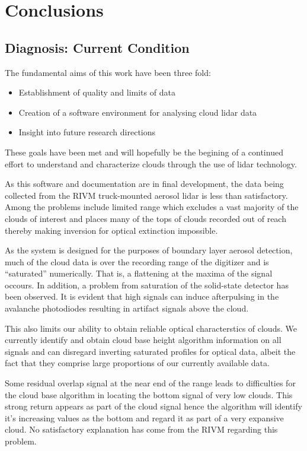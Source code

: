 \chapter{Conclusions}

\section{Diagnosis: Current Condition}

The fundamental aims of this work have been 
three fold:

\begin{itemize}
\item Establishment of quality and limits of data
\item Creation of a software environment for analysing
cloud lidar data
\item Insight into future research directions
\end{itemize}

\noindent
These goals have been met and will hopefully be the begining
of a continued effort to understand and characterize clouds
through the use of lidar technology.

As this software and documentation are in final
development, the data being collected from the RIVM truck-mounted aerosol
lidar is less than satisfactory. Among the problems include limited
range which excludes a vast majority of the clouds of interest and
places many of the tops of clouds recorded out of reach thereby making
inversion for optical extinction impossible. 

As the system is designed
for the purposes of boundary layer aerosol detection,  much of the cloud
data is over the recording range of the digitizer and is
``saturated'' numerically. That is, a flattening at the maxima of the
signal occours. In addition, a problem from saturation of the solid-state
detector has been observed. It is evident that high signals can induce
afterpulsing in the avalanche photodiodes resulting in artifact signals
above the cloud.

This also limits our ability to obtain reliable
optical characterstics of clouds. We currently identify and 
obtain cloud base height algorithm \cite{srpwsaic} 
information on all signals and can 
disregard inverting saturated profiles for optical data, 
albeit the fact that they comprise large proportions of 
our currently available data.

Some residual overlap signal at the near end of the range leads to
difficulties for the cloud base algorithm in locating the bottom
signal of very low clouds. This strong return appears as part of
the cloud signal hence the algorithm will identify it's increasing
values as the bottom and regard it as part of a very expansive
cloud. No satisfactory explanation has come from the RIVM regarding
this problem.

